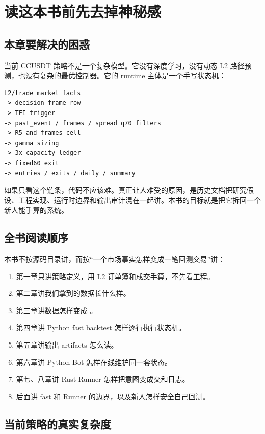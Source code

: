 \chapter{读这本书前先去掉神秘感}

\section{本章要解决的困惑}

当前 CCUSDT 策略不是一个复杂模型。它没有深度学习，没有动态 L2 路径预测，也没有复杂的最优控制器。它的 runtime 主体是一个手写状态机：

\begin{lstlisting}
L2/trade market facts
-> decision_frame row
-> TFI trigger
-> past_event / frames / spread q70 filters
-> R5 and frames cell
-> gamma sizing
-> 3x capacity ledger
-> fixed60 exit
-> entries / exits / daily / summary
\end{lstlisting}

如果只看这个链条，代码不应该难。真正让人难受的原因，是历史文档把研究假设、工程实现、运行时边界和输出审计混在一起讲。本书的目标就是把它拆回一个新人能手算的系统。

\section{全书阅读顺序}

本书不按源码目录讲，而按“一个市场事实怎样变成一笔回测交易”讲：

\begin{enumerate}[leftmargin=2em]
  \item 第一章只讲策略定义，用 L2 订单簿和成交手算，不先看工程。
  \item 第二章讲我们拿到的数据长什么样。
  \item 第三章讲数据怎样变成 。
  \item 第四章讲 Python fast backtest 怎样逐行执行状态机。
  \item 第五章讲输出 artifacts 怎么读。
  \item 第六章讲 Python Bot 怎样在线维护同一套状态。
  \item 第七、八章讲 Rust Runner 怎样把意图变成交和日志。
  \item 后面讲 fast 和 Runner 的边界，以及新人怎样安全自己回测。
\end{enumerate}

\section{当前策略的真实复杂度}

